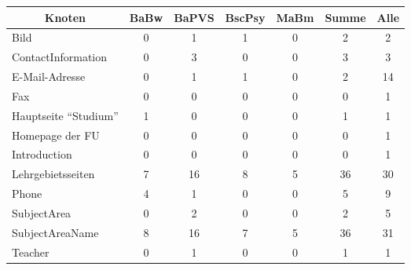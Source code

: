     \begin{table}[htb]
        \centering
        \begin{tabular}{|l|c|c|c|c|c|c|}
            \hline
            \multicolumn{1}{|c|}{\textbf{Knoten}} & \textbf{BaBw} & \textbf{BaPVS} & \textbf{BscPsy} & \textbf{MaBm} & \textbf{Summe} & \textbf{Alle} \\ \hline
            Bild                                  & 0             & 1              & 1               & 0             & 2              & 2             \\ \hline
            ContactInformation                    & 0             & 3              & 0               & 0             & 3              & 3             \\ \hline
            E-Mail-Adresse                        & 0             & 1              & 1               & 0             & 2              & 14            \\ \hline
            Fax                                   & 0             & 0              & 0               & 0             & 0              & 1             \\ \hline
            Hauptseite "`Studium"'                & 1             & 0              & 0               & 0             & 1              & 1             \\ \hline
            Homepage der FU                       & 0             & 0              & 0               & 0             & 0              & 1             \\ \hline
            Introduction                          & 0             & 0              & 0               & 0             & 0              & 1             \\ \hline
            Lehrgebietsseiten                     & 7             & 16             & 8               & 5             & 36             & 30            \\ \hline
            Phone                                 & 4             & 1              & 0               & 0             & 5              & 9             \\ \hline
            SubjectArea                           & 0             & 2              & 0               & 0             & 2              & 5             \\ \hline
            SubjectAreaName                       & 8             & 16             & 7               & 5             & 36             & 31            \\ \hline
            Teacher                               & 0             & 1              & 0               & 0             & 1              & 1             \\ \hline

\end{tabular}
\end{table}
